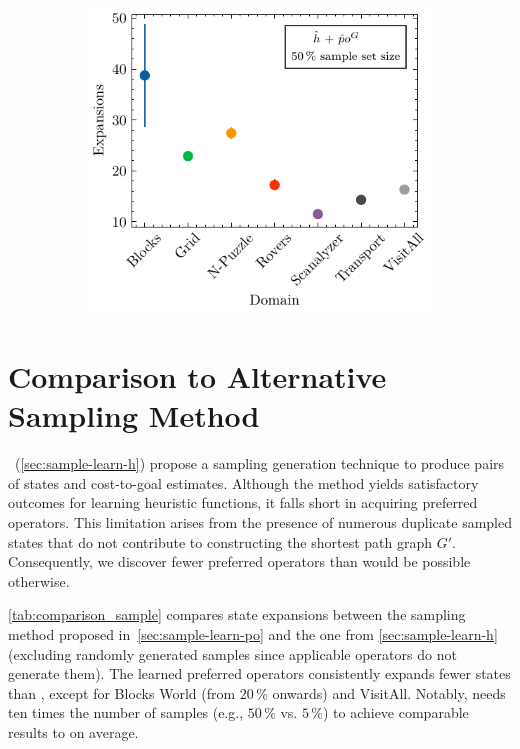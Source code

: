 \documentclass[ppgc,diss,english]{iiufrgs}
\begin{document}
\begin{figure}[tb]
  \vspace{0.5cm}

  \begin{subfigure}{0.41\textwidth}
    \centering
    \includegraphics[width=\linewidth]{img/error_hNN_poG_50pct.pdf}
  \end{subfigure}
  \label{fig:errors}
\end{figure}


\section{Comparison to Alternative Sampling Method}
\label{sec:exp-comparison-sample-method}
\citet{Bettker.etal/2022}~(\cref{sec:sample-learn-h}) propose a sampling generation technique to produce pairs of states and cost-to-goal estimates. Although the method yields satisfactory outcomes for learning heuristic functions, it falls short in acquiring preferred operators.
This limitation arises from the presence of numerous duplicate sampled states that do not contribute to constructing the shortest path graph $G'$. Consequently, we discover fewer preferred operators than would be possible otherwise.

\cref{tab:comparison_sample} compares state expansions between the sampling method proposed in~\cref{sec:sample-learn-po} \pog and the one from \cref{sec:sample-learn-h} \pofsm (excluding randomly generated samples since applicable operators do not generate them). The learned preferred operators \pog consistently expands fewer states than \pofsm, except for Blocks World (from $20\,\%$ onwards) and VisitAll. Notably, \pofsm needs ten times the number of samples (e.g., $50\,\%$ vs. $5\,\%$) to achieve comparable results to \pog on average.
\end{document}
